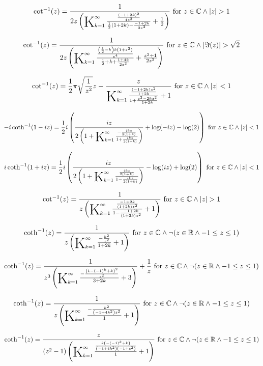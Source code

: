 \documentclass{article}
\newcommand{\bigK}{\mathop{\raisebox{-5pt}{\huge K}}}
\begin{document}
\[\cot ^{-1}(z)=\frac{1}{2 z \left(\bigK_{k=1}^{\infty}\frac{\frac{(-1+2 k)^2}{4 z^2}}{\frac{1}{2} (1+2 k)-\frac{-1+2 k}{2 z^2}}+\frac{1}{2}\right)}\text{ for }z\in \mathbb{C}\land \left| z\right| >1\] 

\[\cot ^{-1}(z)=\frac{1}{2 z \left(\bigK_{k=1}^{\infty}\frac{\frac{\left(\frac{1}{2}-k\right) k \left(1+z^2\right)}{z^4}}{\frac{1}{2}+k+\frac{1+4 k}{2 z^2}}+\frac{z^2+1}{2 z^2}\right)}\text{ for }z\in \mathbb{C}\land \left| \Im(z)\right| >\sqrt{2}\] 

\[\cot ^{-1}(z)=\frac{1}{2} \pi  \sqrt{\frac{1}{z^2}} z-\frac{z}{\bigK_{k=1}^{\infty}\frac{\frac{(-1+2 k) z^2}{1+2 k}}{1+\frac{z^2-2 k z^2}{1+2 k}}+1}\text{ for }z\in \mathbb{C}\land \left| z\right| <1\] 

\[-i \coth ^{-1}(1-i z)=\frac{1}{2} i \left(\frac{i z}{2 \left(1+\bigK_{k=1}^{\infty}\frac{-\frac{i k z}{2 (1+k)}}{1+\frac{i k z}{2 (1+k)}}\right)}+\log (-i z)-\log (2)\right)\text{ for }z\in \mathbb{C}\land \left| z\right| <1\] 

\[i \coth ^{-1}(1+i z)=\frac{1}{2} i \left(\frac{i z}{2 \left(1+\bigK_{k=1}^{\infty}\frac{\frac{i k z}{2 (1+k)}}{1-\frac{i k z}{2 (1+k)}}\right)}-\log (i z)+\log (2)\right)\text{ for }z\in \mathbb{C}\land \left| z\right| <1\] 

\[\cot ^{-1}(z)=\frac{1}{z \left(\bigK_{k=1}^{\infty}\frac{\frac{-1+2 k}{(1+2 k) z^2}}{1-\frac{-1+2 k}{(1+2 k) z^2}}+1\right)}\text{ for }z\in \mathbb{C}\land \left| z\right| >1\] 

\[\coth ^{-1}(z)=\frac{1}{z \left(\bigK_{k=1}^{\infty}\frac{-\frac{k^2}{z^2}}{1+2 k}+1\right)}\text{ for }z\in \mathbb{C}\land \neg (z\in \mathbb{R}\land -1\leq z\leq 1)\] 

\[\coth ^{-1}(z)=\frac{1}{z^3 \left(\bigK_{k=1}^{\infty}\frac{-\frac{\left(1-(-1)^k+k\right)^2}{z^2}}{3+2 k}+3\right)}+\frac{1}{z}\text{ for }z\in \mathbb{C}\land \neg (z\in \mathbb{R}\land -1\leq z\leq 1)\] 

\[\coth ^{-1}(z)=\frac{1}{z \left(\bigK_{k=1}^{\infty}\frac{-\frac{k^2}{\left(-1+4 k^2\right) z^2}}{1}+1\right)}\text{ for }z\in \mathbb{C}\land \neg (z\in \mathbb{R}\land -1\leq z\leq 1)\] 

\[\coth ^{-1}(z)=\frac{z}{\left(z^2-1\right) \left(\bigK_{k=1}^{\infty}\frac{\frac{k \left(-(-1)^k+k\right)}{\left(-1+4 k^2\right) \left(-1+z^2\right)}}{1}+1\right)}\text{ for }z\in \mathbb{C}\land \neg (z\in \mathbb{R}\land -1\leq z\leq 1)\] 
\end{document}
